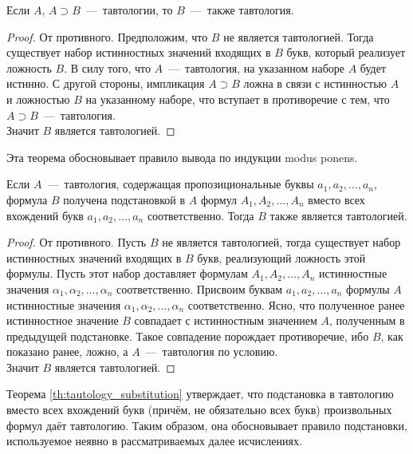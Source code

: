 \begin{theorem}\label{th:modus_ponens}
    Если $A$, $A \supset B$~---~тавтологии, то $B$~---~также тавтология.
\end{theorem}
\begin{proof}
    От противного. Предположим, что $B$ не является тавтологией. Тогда существует набор истинностных значений входящих в $B$ букв, который реализует ложность $B$. В силу того, что $A$~---~тавтология, на указанном наборе $A$ будет истинно. С другой стороны, импликация $A \supset B$ ложна в связи с истинностью $A$ и ложностью $B$ на указанному наборе, что вступает в противоречие с тем, что $A \supset B$~---~тавтология. \\
    Значит $B$ является тавтологией.
\end{proof}

Эта теорема обосновывает правило вывода по индукции modus ponens.

\begin{theorem}\label{th:tautology_substitution}
    Если $A$~---~тавтология, содержащая пропозициональные буквы $a_1, a_2, \dots, a_n$, формула $B$ получена подстановкой в $A$ формул $A_1, A_2, \dots, A_n$ вместо всех вхождений букв $a_1, a_2, \dots, a_n$ соответственно. Тогда $B$ также является тавтологией.
\end{theorem}
\begin{proof}
    От противного. Пусть $B$ не является тавтологией, тогда существует набор истинностных значений входящих в $B$ букв, реализующий ложность этой формулы. Пусть этот набор доставляет формулам $A_1, A_2, \dots, A_n$ истинностные значения $\alpha_1, \alpha_2, \dots, \alpha_n$ соответственно. Присвоим буквам $a_1, a_2, \dots, a_n$ формулы $A$ истинностные значения $\alpha_1, \alpha_2, \dots, \alpha_n$ соответственно. Ясно, что полученное ранее истинностное значение $B$ совпадает с истинностным значением $A$, полученным в предыдущей подстановке. Такое совпадение порождает противоречие, ибо $B$, как показано ранее, ложно, а $A$~---~тавтология по условию. \\
    Значит $B$ является тавтологией.
\end{proof}

Теорема \ref{th:tautology_substitution} утверждает, что подстановка в тавтологию вместо всех вхождений букв (причём, не обязательно всех букв) произвольных формул даёт тавтологию. Таким образом, она обосновывает правило подстановки, используемое неявно в рассматриваемых далее исчислениях.